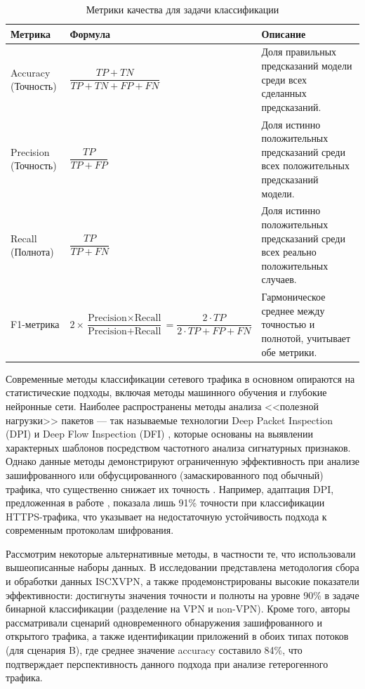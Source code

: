 \begin{table}[h]
	\centering
	\caption{Метрики качества для задачи классификации}
	\label{tab:metrics}
	\begin{tabular}{|>{\centering\arraybackslash}p{3cm}|>{\centering\arraybackslash}p{5.5cm}|>{\centering\arraybackslash}p{6cm}|}
		\hline
		Метрика & Формула & Описание \\
		\hline
		\rule{0pt}{4ex}
		Accuracy (Точность) & 
		$\dfrac{TP + TN}{TP + TN + FP + FN}$ &
		Доля правильных предсказаний модели среди всех сделанных предсказаний. \\
		
		\hline
		\rule{0pt}{4ex}
		Precision (Точность) & 
		$\dfrac{TP}{TP + FP}$ &
		Доля истинно положительных предсказаний среди всех положительных предсказаний модели. \\
		
		\hline
		\rule{0pt}{4ex}
		Recall (Полнота) & 
		$\dfrac{TP}{TP + FN}$ &
		Доля истинно положительных предсказаний среди всех реально положительных случаев. \\
		
		\hline
		\rule{0pt}{4ex}
		F1-метрика & 
		$2 \times \dfrac{\text{Precision} \times \text{Recall}}{\text{Precision} + \text{Recall}} = \dfrac{2 \cdot TP}{2 \cdot TP + FP + FN}$ &
		Гармоническое среднее между точностью и полнотой, учитывает обе метрики. \\
		\hline
	\end{tabular}
\end{table}


Современные методы классификации сетевого трафика в основном опираются на статистические подходы, включая методы машинного обучения и глубокие нейронные сети. Наиболее распространены методы анализа <<полезной нагрузки>> пакетов — так называемые технологии Deep Packet Inspection (DPI) \cite{Fang2006} и Deep Flow Inspection (DFI) \cite{Meiners2012}, которые основаны на выявлении характерных шаблонов посредством частотного анализа сигнатурных признаков. Однако данные методы демонстрируют ограниченную эффективность при анализе зашифрованного или обфусцированного (замаскированного под обычный) трафика, что существенно снижает их точность \cite{Bregni2010}. Например, адаптация DPI, предложенная в работе \cite{Sherry2015}, показала лишь 91\% точности при классификации HTTPS-трафика, что указывает на недостаточную устойчивость подхода к современным протоколам шифрования.

Рассмотрим некоторые альтернативные методы, в частности те, что использовали вышеописанные наборы данных. В исследовании \cite{icissp16} представлена методология сбора и обработки данных ISCXVPN, а также продемонстрированы высокие показатели эффективности: достигнуты значения точности и полноты на уровне 90\% в задаче бинарной классификации (разделение на VPN и non-VPN). Кроме того, авторы рассматривали сценарий одновременного обнаружения зашифрованного и открытого трафика, а также идентификации приложений в обоих типах потоков (для сценария B), где среднее значение accuracy составило 84\%, что подтверждает перспективность данного подхода при анализе гетерогенного трафика.

